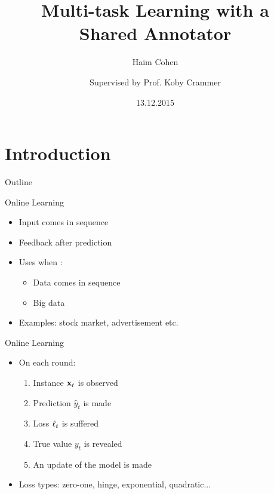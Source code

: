 \documentclass{beamer}
\title []{Multi-task Learning with a  \\Shared Annotator}    %
\author [H. Cohen and K. Crammer]{Haim Cohen \and \newline\newline  Supervised by Prof. Koby Crammer\newline\newline}
\institute [Technion]{Faculty of Electrical Engineering, Technion\\
Israel Institute of Technology}
\date[December 13th, 2015]{13.12.2015}
\begin{document}
\maketitle
\section{Introduction}

\begin{frame}{Outline}
  \tableofcontents[pausesections]
\end{frame}


\begin{frame}{Online Learning}
\begin{itemize}
\item Input  comes in sequence \newline
\item Feedback after prediction  \newline
\item   Uses when  : \newline
\begin{itemize}
\item Data comes in sequence \newline
\item Big data \newline
\end{itemize}
\item Examples: stock market, advertisement etc.\newline

\end{itemize}
\end{frame}


\begin{frame}{Online Learning}
\begin{itemize}
\item On each round:\newline
\begin{enumerate}
\item Instance $\mathbf{x}_{t}$ is observed\newline
\item Prediction $\hat{y}_t$ is made\newline
\item Loss $\ell_{t}$ is suffered\newline
\item True value $y_t$ is revealed\newline
\item An update of the model is made\newline
\end{enumerate}
\item Loss types: zero-one, hinge, exponential, quadratic...
\end{itemize}
\end{frame}
\end{document}
